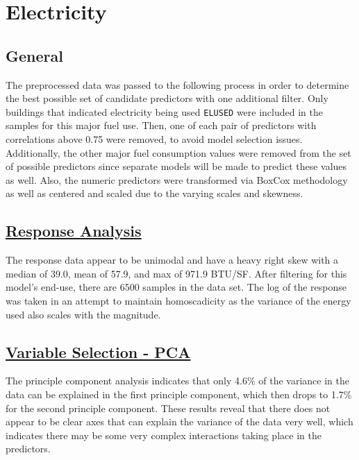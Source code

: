 \section*{Electricity}
\label{sec:electricity}

\subsection{General}

The preprocessed data was passed to the following process in order to determine the best possible set of candidate predictors with one additional filter.  Only buildings that indicated electricity being used \lstinline{ELUSED} were included in the samples for this major fuel use.  Then, one of each pair of predictors with correlations above 0.75 were removed, to avoid model selection issues. Additionally, the other major fuel consumption values were removed from the set of possible predictors since separate models will be made to predict these values as well.  Also, the numeric predictors were transformed via BoxCox methodology as well as centered and scaled due to the varying scales and skewness.

\subsection{\hyperref[appendix:electricity:response]{Response Analysis}}

The response data appear to be unimodal and have a heavy right skew with a median of 39.0, mean of 57.9, and max of 971.9 BTU/SF.  After filtering for this model's end-use, there are 6500 samples in the data set.  The log of the response was taken in an attempt to maintain homoscadicity as the variance of the energy used also scales with the magnitude.

\subsection{\hyperref[appendix:electricity:pca]{Variable Selection - PCA}}

The principle component analysis indicates that only 4.6\% of the variance in the data can be explained in the first principle component, which then drops to 1.7\% for the second principle component.  These results reveal that there does not appear to be clear axes that can explain the variance of the data very well, which indicates there may be some very complex interactions taking place in the predictors.

